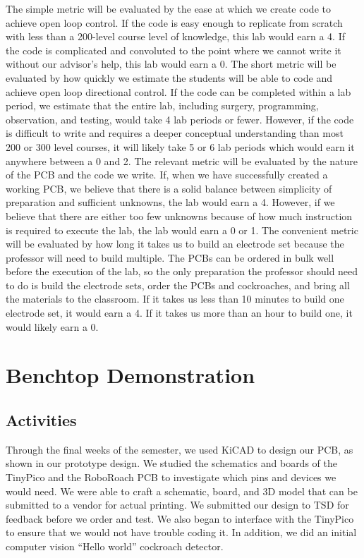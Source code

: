 \documentclass[twocolumn,10pt]{IEEEtran}
\begin{document}
The simple metric will be evaluated by the ease at which we create code to achieve open loop control. If the code is easy enough to replicate from scratch with less than a 200-level course level of knowledge, this lab would earn a 4. If the code is complicated and convoluted to the point where we cannot write it without our advisor's help, this lab would earn a 0. The short metric will be evaluated by how quickly we estimate the students will be able to code and achieve open loop directional control. If the code can be completed within a lab period, we estimate that the entire lab, including surgery, programming, observation, and testing, would take 4 lab periods or fewer. However, if the code is difficult to write and requires a deeper conceptual understanding than most 200 or 300 level courses, it will likely take 5 or 6 lab periods which would earn it anywhere between a 0 and 2. The relevant metric will be evaluated by the nature of the PCB and the code we write. If, when we have successfully created a working PCB, we believe that there is a solid balance between simplicity of preparation and sufficient unknowns, the lab would earn a 4. However, if we believe that there are either too few unknowns because of how much instruction is required to execute the lab, the lab would earn a 0 or 1. The convenient metric will be evaluated by how long it takes us to build an electrode set because the professor will need to build multiple. The PCBs can be ordered in bulk well before the execution of the lab, so the only preparation the professor should need to do is build the electrode sets, order the PCBs and cockroaches, and bring all the materials to the classroom. If it takes us less than 10 minutes to build one electrode set, it would earn a 4. If it takes us more than an hour to build one, it would likely earn a 0.

\section{Benchtop Demonstration}
\subsection{Activities}
Through the final weeks of the semester, we used KiCAD to design our PCB, as shown in our prototype design. We studied the schematics and boards of the TinyPico and the RoboRoach PCB to investigate which pins and devices we would need. We were able to craft a schematic, board, and 3D model that can be submitted to a vendor for actual printing. We submitted our design to TSD for feedback before we order and test. We also began to interface with the TinyPico to ensure that we would not have trouble coding it. In addition, we did an initial computer vision ``Hello world'' cockroach detector. 
\end{document}
